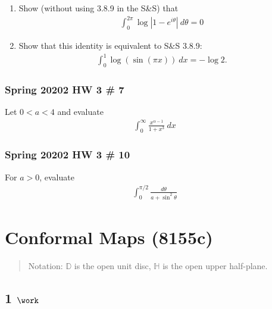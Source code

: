 \begin{enumerate}
\def\labelenumi{\alph{enumi}.}
\item
  Show (without using 3.8.9 in the S\&S) that
  \begin{align*}
  \int_0^{2\pi} \log{\left\lvert {1 - e^{i\theta}} \right\rvert}~d\theta = 0
  \end{align*}
\item
  Show that this identity is equivalent to S\&S 3.8.9:
  \begin{align*}
  \int_0^1 \log(\sin(\pi x)) ~dx = -\log 2
  .\end{align*}
\end{enumerate}

\hypertarget{spring-20202-hw-3-7}{%
\subsubsection{Spring 20202 HW 3 \# 7}\label{spring-20202-hw-3-7}}

Let \(0<a<4\) and evaluate
\begin{align*}
\int_0^\infty \frac{x^{\alpha-1}}{1+x^3} ~dx
\end{align*}

\hypertarget{spring-20202-hw-3-10}{%
\subsubsection{Spring 20202 HW 3 \# 10}\label{spring-20202-hw-3-10}}

For \(a> 0\), evaluate
\begin{align*}
\int_0^{\pi/2} \frac{d\theta}{a + \sin^2 \theta}
\end{align*}

\hypertarget{conformal-maps-8155c}{%
\section{Conformal Maps (8155c)}\label{conformal-maps-8155c}}

\begin{quote}
Notation: \({\mathbb{D}}\) is the open unit disc, \({\mathbb{H}}\) is
the open upper half-plane.
\end{quote}

\hypertarget{work-52}{%
\subsection{\texorpdfstring{1
\(\work\)}{1 \textbackslash work}}\label{work-52}}

